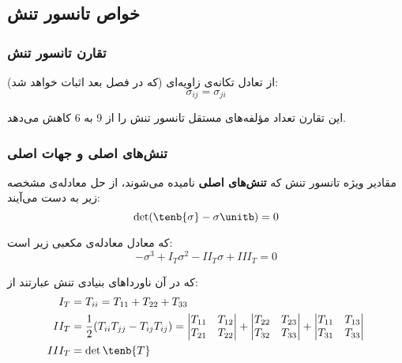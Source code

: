 \subsection{خواص تانسور تنش}

\subsubsection{تقارن تانسور تنش}
از تعادل تکانه‌ی زاویه‌ای (که در فصل بعد اثبات خواهد شد):
\begin{equation}
	\sigma_{ij} = \sigma_{ji}
\end{equation}

این تقارن تعداد مؤلفه‌های مستقل تانسور تنش را از 9 به 6 کاهش می‌دهد.

\subsubsection{تنش‌های اصلی و جهات اصلی}
مقادیر ویژه تانسور تنش که \textbf{تنش‌های اصلی} نامیده می‌شوند، از حل معادله‌ی مشخصه زیر به دست می‌آیند:
\begin{equation}
	\det(\tenb{\sigma} - \sigma \unitb) = 0
\end{equation}

که معادل معادله‌ی مکعبی زیر است:
\begin{equation}
	-\sigma^3 + I_T \sigma^2 - II_T \sigma + III_T = 0
\end{equation}

که در آن ناورداهای بنیادی تنش عبارتند از:
\begin{align}
	I_T   & = T_{ii} = T_{11} + T_{22} + T_{33}                                                                                                                                                                                                                   \\
	II_T  & = \frac{1}{2}(T_{ii} T_{jj} - T_{ij} T_{ij}) = \begin{vmatrix} T_{11} & T_{12} \\ T_{21} & T_{22} \end{vmatrix} + \begin{vmatrix} T_{22} & T_{23} \\ T_{32} & T_{33} \end{vmatrix} + \begin{vmatrix} T_{11} & T_{13} \\ T_{31} & T_{33} \end{vmatrix} \\
	III_T & = \det \tenb{T}
\end{align}


